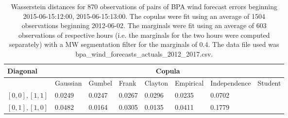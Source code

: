 \begin{table}[h] 
    \centering 
    \begin{tabular}{|l|l|l|l|l|l|l|l|} \hline 
        \textbf{Diagonal} & \multicolumn{7}{c|}{\textbf{Copula}} \\ \hline 
        & Gaussian & Gumbel & Frank & Clayton & Empirical & Independence & Student \\ \hline 
        $[0,0], [1,1]$ & 0.0249 & 0.0247 & 0.0267 & 0.0296 & 0.0235 & 0.0702 &  \\ \hline 
        $[0,1], [1,0]$ & 0.0482 & 0.0164 & 0.0305 & 0.0135 & 0.0411 & 0.1779 &  \\ \hline 
    \end{tabular} 
    \caption{Wasserstein distances for 870 observations of pairs of BPA wind forecast errors beginning 2015-06-15:12:00, 2015-06-15:13:00. The copulas were fit  using an average of 1504 observations beginning 2012-06-02. The marginals were fit using an average of 603 observations of respective hours (i.e. the  marginals for the two hours were computed separately) with a MW segmentation filter for the marginals of 0.4. The data file used was bpa\_wind\_forecasts\_actuals\_2012\_2017.csv.} 
\end{table}